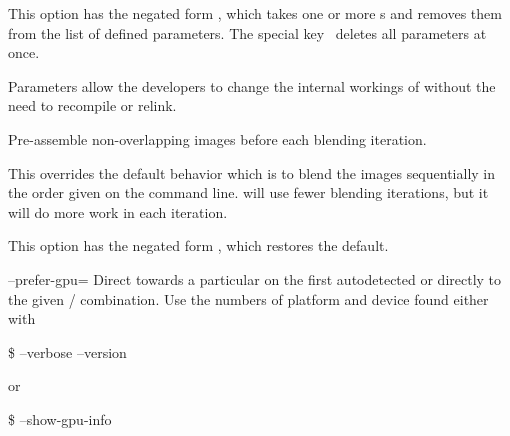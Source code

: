 \begin{codelist}
  This option has the negated form %
  , which takes one or more s and removes them from the list
  of defined parameters.  The special key~\sample{*} deletes all parameters at once.

  Parameters allow the developers to change the internal workings of \App{} without the need to
  recompile or relink.

\begin{sgquote}

\end{sgquote}


\ifenblend
    \label{opt:pre-assemble}%
  \item[\itempar{-a \\ --pre-assemble}]\itemend
    Pre-assemble non-overlapping images before each blending iteration.

    This overrides the default behavior which is to blend the images sequentially in the order
    given on the command line.  \App{} will use fewer blending iterations, but it will do more
    work in each iteration.

    This option has the negated form %
    , which restores the default.
\fi


  \label{opt:prefer-gpu}%
\item[--prefer-gpu=\optional{\metavar{PLATFORM}:}\metavar{DEVICE}
  \restrictednote{\acronym{OpenCL}-enabled versions only.}]\itemend
  Direct \App{} towards a particular   on the first autodetected
   or directly to the given \slash{}
  combination.  Use the numbers of platform and device found either with

  \begin{terminal}
    \$ \app{} --verbose --version
  \end{terminal}
  or
  \begin{terminal}
    \$ \app{} --show-gpu-info
  \end{terminal}


\end{codelist}

